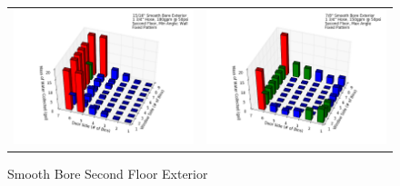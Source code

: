 \documentclass{article}
\begin{document}
\begin{appendices}
\begin{figure}[ht]
{\begin{tabular*}{\textwidth}{lr}
\includegraphics[width=3.2in]{../ADD_Analysis/Figures/15-12-07_141333_Datafile_15_16in_Smooth_Bore_Exterior.png} &
\includegraphics[width=3.2in]{../ADD_Analysis/Figures/15-12-07_143141_Datafile_7_8in_Smooth_Bore_Exterior.png} \\
\end{tabular*}}
\centering
{}
\caption{Smooth Bore Second Floor Exterior}
\label{fig:Smooth Bore Second Floor Exterior}
\end{figure}

\clearpage


\end{appendices}
\end{document}
